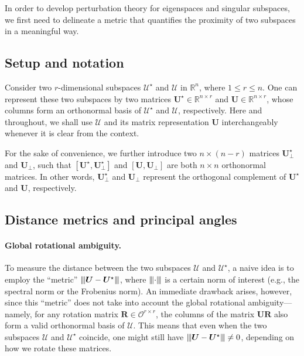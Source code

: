 In order to develop perturbation theory for eigenspaces and singular subspaces, we first need to delineate a metric that quantifies the proximity of two subspaces in a meaningful way.

\subsection{Setup and notation}
\label{sec:setting-distance-angle}

Consider two $r$-dimensional subspaces  $\mathcal{U}^{\star}$ and ${\mathcal{U}}$ in $\mathbb{R}^{n}$, where $1\le r\le n$.
One can represent these two subspaces by two matrices
 $\bm{U}^{\star} \in \mathbb{R}^{n\times r}$
and ${\bm{U}} \in \mathbb{R}^{n\times r}$, whose columns form an orthonormal
basis of $\mathcal{U}^{\star}$ and ${\mathcal{U}}$, respectively.
Here and throughout, we shall use $\mathcal{U}$ and its matrix representation $\bm{U}$ interchangeably whenever it is clear from the context.

For the sake of convenience, we further introduce two $n\times (n-r)$ matrices $\bm{U}^{\star}_{\perp}$ and $\bm{U}_{\perp}$, such that $[\bm{U}^{\star},\bm{U}_{\perp}^{\star}]$ and $[\bm{U},\bm{U}_{\perp}]$ are both $n\times n$ orthonormal matrices.
In other words, $\bm{U}_{\perp}^{\star}$ and $\bm{U}_{\perp}$ represent the orthogonal complement of $\bm{U}^{\star}$ and $\bm{U}$, respectively.



\subsection{Distance metrics and principal angles}
\label{sec:introduction-distance-principal-angles}


\paragraph{Global rotational ambiguity.} To measure the distance between the two subspaces $\mathcal{U}$ and ${\mathcal{U}}^{\star}$,
a naive idea is to employ the ``metric'' ${\vert\kern-0.25ex\vert\kern-0.25ex\vert \bm{U}-{\bm{U}}^{\star} \vert\kern-0.25ex\vert\kern-0.25ex\vert}$,
where ${\left\vert\kern-0.25ex\left\vert\kern-0.25ex\left\vert \cdot \right\vert\kern-0.25ex\right\vert\kern-0.25ex\right\vert}$ is a certain norm of interest (e.g., the spectral norm or the Frobenius norm).
An immediate drawback arises, however, since this ``metric'' does not
take into account the global rotational ambiguity---namely, for any rotation matrix $\bm{R}\in\mathcal{O}^{r\times r}$,
the columns of the matrix $\bm{U}\bm{R}$ also form a valid orthonormal basis of $\mathcal{U}$.
This means that even when the two subspaces $\mathcal{U}$ and ${\mathcal{U}}^{\star}$ coincide, one might still have ${\vert\kern-0.25ex\vert\kern-0.25ex\vert \bm{U}-{\bm{U}^{\star}} \vert\kern-0.25ex\vert\kern-0.25ex\vert} \neq 0$, depending on how we rotate these matrices.



